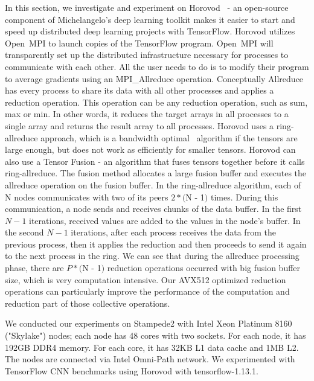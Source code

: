 \documentclass[sigconf]{acmart}
\newcommand{\ompi}[0]{Open~MPI\xspace}
\begin{document}
In this section, we investigate and experiment on Horovod~\cite{sergeev2018horovod} - an
open-source component of Michelangelo's deep learning toolkit makes it easier to start and 
speed up distributed deep learning projects with TensorFlow.
%
Horovod utilizes \ompi to launch copies of the TensorFlow program. \ompi will transparently set up the distributed infrastructure necessary for processes to communicate with each other. All the user needs to do is to
modify their program to average gradients using an MPI\_Allreduce operation. 
%
Conceptually Allreduce has every process to share its data with all other processes and applies a reduction operation. 
This operation can be any reduction operation, such as sum, max or min. 
In other words, it reduces the target arrays in all processes
to a single array and returns the result array to all processes. 
%
Horovod uses a ring-allreduce approach, which is a bandwidth optimal~\cite{allreduce-optimal} algorithm if the tensors are large enough, but does not
work as efficiently for smaller tensors.
Horovod can also use a Tensor Fusion - an algorithm that fuses tensors together
before it calls ring-allreduce. The fusion method allocates a large fusion buffer and executes the
allreduce operation on the fusion buffer.
%
In the ring-allreduce algorithm, each of N nodes communicates with two of its
peers $2 * ($N - 1$)$ times. During this communication, a node sends and receives chunks of the data
buffer. In the first $N - 1$ iterations, received values are added to the values in the node's buffer. In
the second $N - 1$ iterations, after each process receives the data from the previous process, then it
applies the reduction and then proceeds to send it again to the next process in the ring. 
%
We can see that during the allreduce processing phase, there are $P * ($N - 1$)$ reduction operations
occurred with big fusion buffer size, which is very computation intensive.
Our AVX512 optimized reduction operations can particularly improve the performance 
of the computation and reduction part of those collective operations.

We conducted our experiments on Stampede2 with Intel Xeon Platinum 8160 ("Skylake") nodes; each node has 48 cores with two sockets. For each node, it has 192GB DDR4 memory. For each core, it has 32KB L1 data cache and 1MB L2. The nodes are connected via Intel Omni-Path network.
We experimented with TensorFlow CNN benchmarks using Horovod with tensorflow-1.13.1.
\end{document}
